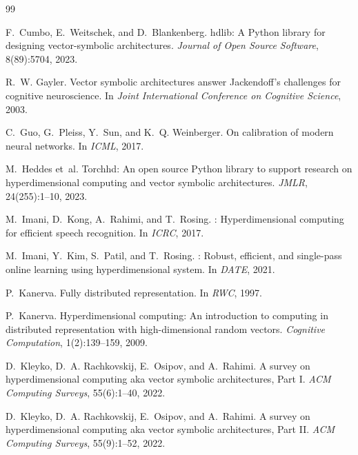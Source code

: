 \documentclass[11pt]{article}
\begin{document}

\begin{thebibliography}{99}

F.~Cumbo, E.~Weitschek, and D.~Blankenberg.
\newblock hdlib: A Python library for designing vector-symbolic architectures.
\newblock \textit{Journal of Open Source Software}, 8(89):5704, 2023.

R.~W. Gayler.
\newblock Vector symbolic architectures answer Jackendoff's challenges for cognitive neuroscience.
\newblock In \textit{Joint International Conference on Cognitive Science}, 2003.

C.~Guo, G.~Pleiss, Y.~Sun, and K.~Q. Weinberger.
\newblock On calibration of modern neural networks.
\newblock In \textit{ICML}, 2017.

M.~Heddes et~al.
\newblock Torchhd: An open source Python library to support research on hyperdimensional computing and vector symbolic architectures.
\newblock \textit{JMLR}, 24(255):1--10, 2023.

M.~Imani, D.~Kong, A.~Rahimi, and T.~Rosing.
: Hyperdimensional computing for efficient speech recognition.
\newblock In \textit{ICRC}, 2017.

M.~Imani, Y.~Kim, S.~Patil, and T.~Rosing.
: Robust, efficient, and single-pass online learning using hyperdimensional system.
\newblock In \textit{DATE}, 2021.

P.~Kanerva.
\newblock Fully distributed representation.
\newblock In \textit{RWC}, 1997.

P.~Kanerva.
\newblock Hyperdimensional computing: An introduction to computing in distributed representation with high-dimensional random vectors.
\newblock \textit{Cognitive Computation}, 1(2):139--159, 2009.

D.~Kleyko, D.~A. Rachkovskij, E.~Osipov, and A.~Rahimi.
\newblock A survey on hyperdimensional computing aka vector symbolic architectures, Part I.
\newblock \textit{ACM Computing Surveys}, 55(6):1--40, 2022.

D.~Kleyko, D.~A. Rachkovskij, E.~Osipov, and A.~Rahimi.
\newblock A survey on hyperdimensional computing aka vector symbolic architectures, Part II.
\newblock \textit{ACM Computing Surveys}, 55(9):1--52, 2022.


\end{thebibliography}
\end{document}
